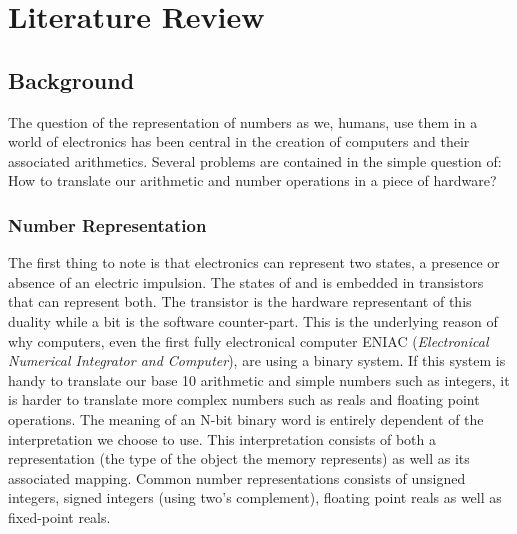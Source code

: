 \chapter{Literature Review} %

\label{Chapter2} %



\section{Background}

The question of the representation of numbers as we, humans, use them in a world of electronics has been central in the creation of computers and their associated arithmetics. Several problems are contained in the simple question of: How to translate our arithmetic and number operations in a piece of hardware?

\subsection{Number Representation}

The first thing to note is that electronics can represent two states, a presence or absence of an electric impulsion. The states of  and  is embedded in transistors that can represent both. The transistor is the hardware representant of this duality while a bit is the software counter-part. This is the underlying reason of why computers, even the first fully electronical computer ENIAC (\emph{Electronical Numerical Integrator and Computer}), are using a binary system. If this system is handy to translate our base 10 arithmetic and simple numbers such as integers, it is harder to translate more complex numbers such as reals and floating point operations. The meaning of an N-bit binary word is entirely dependent of the interpretation we choose to use. This interpretation consists of both a representation (the type of the object the memory represents) as well as its associated mapping. Common number representations consists of unsigned integers, signed integers (using two's complement), floating point reals as well as fixed-point reals.


